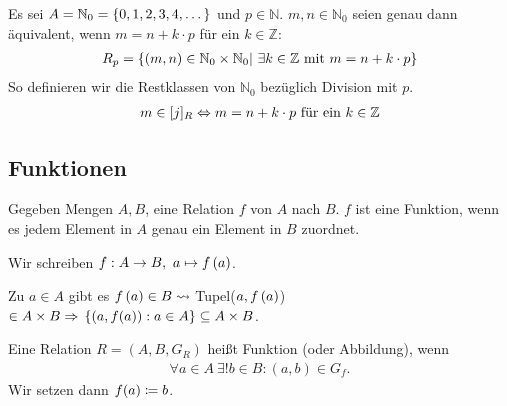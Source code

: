 \begin{beispiel}
    Es sei $A = \mathbb{N}_{0} = \left\{0,1,2,3,4,\dots\right\}$ und $p\in \mathbb{N}$. $m,n\in\mathbb{N}_0$ seien genau dann äquivalent, wenn $m=n+k\cdot p$ für ein $k\in\mathbb{Z}$:
    \begin{align*}
        R_{p} = \left\{\left(m,n\right)\in \mathbb{N}_0 \times \mathbb{N}_0 |~\exists k\in \mathbb{Z}\text{ mit } m=n+k\cdot p\right\}
    \end{align*}
    So definieren wir die Restklassen von $\mathbb{N}_0$ bezüglich Division mit $p$.
    \begin{align*}
        m\in [j]_{R} \Leftrightarrow{} m=n+k\cdot p\text{ für ein }k\in\mathbb{Z}
    \end{align*}
\end{beispiel}


\subsection{Funktionen}

\begin{bemerkung}
    \marginnote{[2. Nov]}
    Gegeben Mengen $A, B$, eine Relation $f$ von $A$ nach $B$. $f$ ist eine Funktion, wenn es jedem Element in $A$ genau ein Element in $B$ zuordnet.
\end{bemerkung}

\begin{notation}[Pfeilnotation]
    Wir schreiben $f: A \rightarrow{} B,~a\mapsto f\left(a\right)$.
\end{notation}
\begin{folgerung}
    Zu $a\in A$ gibt es $f\left(a\right)\in B \leadsto$ Tupel($a, f\left(a\right)$) $\in A\times B \Rightarrow{} \left\{\left(a, f(a)\right): a\in A\right\} \subseteq A\times B$.
\end{folgerung}

\begin{definition}[Funktion]
    Eine Relation $R = (A, B, G_R)$ heißt Funktion (oder Abbildung), wenn
    \begin{align*}
        \forall a\in A~\exists! b\in B\colon (a,b)\in G_f.
    \end{align*}
    Wir setzen dann $f(a)\coloneqq b$.
\end{definition}

